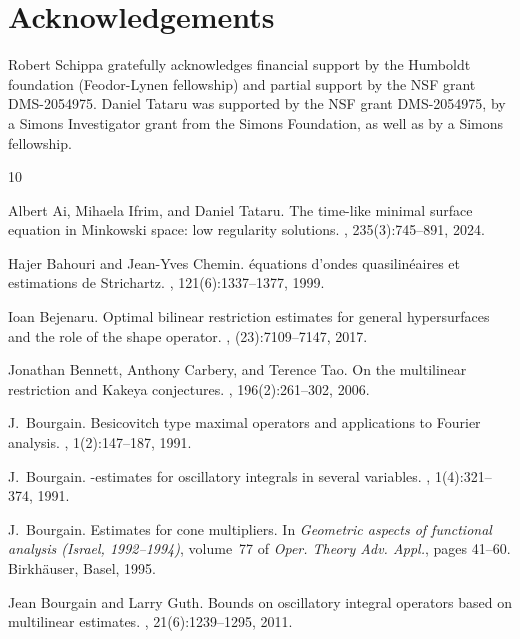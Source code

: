 \documentclass{amsart}
\theoremstyle{definition}
\begin{document}
\section*{Acknowledgements}

Robert Schippa gratefully acknowledges financial support by the Humboldt foundation (Feo\-dor-Lynen fellowship) and partial support by the NSF grant DMS-2054975.
Daniel Tataru was supported by the NSF grant DMS-2054975, by a Simons Investigator grant from the Simons Foundation, as well as by a Simons fellowship. 

\begin{thebibliography}{10}

Albert Ai, Mihaela Ifrim, and Daniel Tataru.
\newblock The time-like minimal surface equation in {Minkowski} space: low
  regularity solutions.
, 235(3):745--891, 2024.

Hajer Bahouri and Jean-Yves Chemin.
\newblock \'equations d'ondes quasilin\'eaires et estimations de {S}trichartz.
, 121(6):1337--1377, 1999.

Ioan Bejenaru.
\newblock Optimal bilinear restriction estimates for general hypersurfaces and
  the role of the shape operator.
, (23):7109--7147, 2017.

Jonathan Bennett, Anthony Carbery, and Terence Tao.
\newblock On the multilinear restriction and {K}akeya conjectures.
, 196(2):261--302, 2006.

J.~Bourgain.
\newblock Besicovitch type maximal operators and applications to {F}ourier
  analysis.
, 1(2):147--187, 1991.

J.~Bourgain.
-estimates for oscillatory integrals in several variables.
, 1(4):321--374, 1991.

J.~Bourgain.
\newblock Estimates for cone multipliers.
\newblock In {\em Geometric aspects of functional analysis ({I}srael,
  1992--1994)}, volume~77 of {\em Oper. Theory Adv. Appl.}, pages 41--60.
  Birkh\"auser, Basel, 1995.

Jean Bourgain and Larry Guth.
\newblock Bounds on oscillatory integral operators based on multilinear
  estimates.
, 21(6):1239--1295, 2011.


\end{thebibliography}
\end{document}

